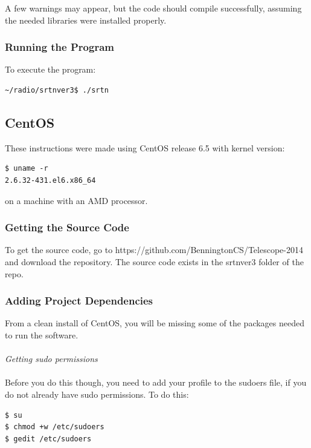 \documentclass[11pt]{article} %
\begin{document}
A few warnings may appear, but the code should compile successfully, assuming the needed libraries were installed properly.
\vspace{1cm}
\subsubsection{Running the Program}
To execute the program:
 
\begin{lstlisting}[frame=single]
~/radio/srtnver3$ ./srtn
\end{lstlisting}


\vspace{1cm}
\subsection{CentOS}


These instructions were made using CentOS release 6.5 with kernel version:

\begin{lstlisting}[frame=single]
$ uname -r
2.6.32-431.el6.x86_64
\end{lstlisting}
on a machine with an AMD processor.

\vspace{1cm}
\subsubsection{Getting the Source Code}
To get the source code, go to https://github.com/BenningtonCS/Telescope-2014 and download the repository. The source code exists in the srtnver3 folder of the repo.


\vspace{1cm}
\subsubsection{Adding Project Dependencies}
From a clean install of CentOS, you will be missing some of the packages needed to run the software.
\\ \\
\emph{Getting sudo permissions} \\ \\
Before you do this though, you need to add your profile to the sudoers file, if you do not already have sudo permissions. To do this:
\begin{lstlisting}[frame=single]
$ su
$ chmod +w /etc/sudoers
$ gedit /etc/sudoers
\end{lstlisting}
\end{document}
